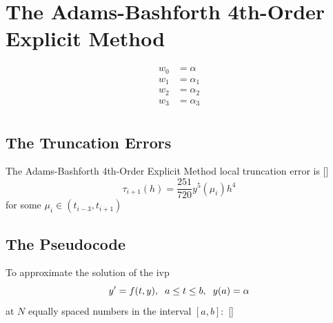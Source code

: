 \documentclass[12pt,oneside]{book}
\begin{document}
	\section{The Adams-Bashforth 4th-Order Explicit Method} \label{m:ab4e}
		\begin{spacing}{1.2}
			
			
			\begin{equation}
				\begin{split}
					w_0 & = \alpha \\
					w_1 & = \alpha_1 \\
					w_2 & = \alpha_2 \\
					w_3 & = \alpha_3 \\
				\end{split}
			\end{equation}
			
			\subsection*{The Truncation Errors}
				The Adams-Bashforth 4th-Order Explicit Method local truncation error is [] \[ \tau_{i+1}(h) = \frac{251}{720} y^{5}(\mu_{i}) h^{4} \]
				for some $ \mu_{i} \in (t_{i-3}, t_{i+1}) $
			
			\clearpage
			\subsection*{The Pseudocode}
				To approximate the solution of the \ac{ivp} 
				\[ y' = f(t,y), \hspace*{0.2cm} a \leq t \leq b, \hspace*{0.2cm} y(a) = \alpha \]
				at $ N $ equally spaced numbers in the interval $ [a, b]: $ []
				

\end{spacing}
\end{document}
